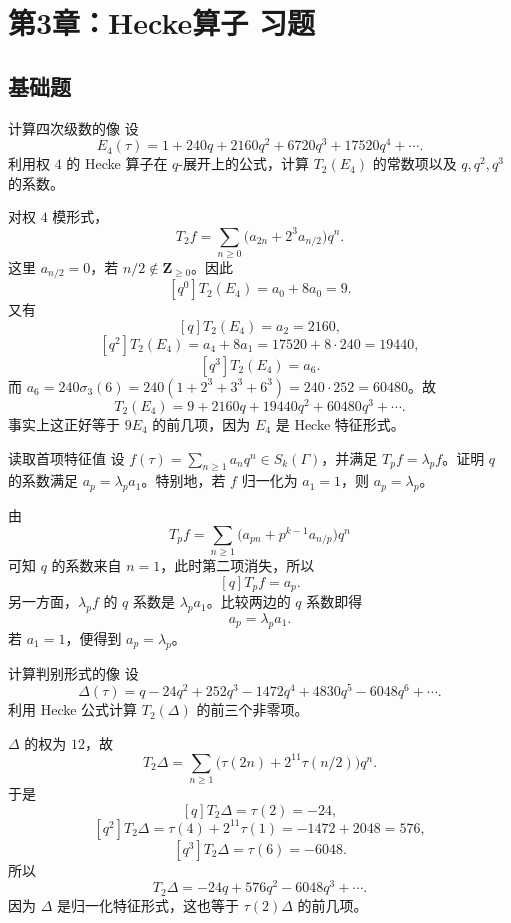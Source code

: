 \chapter{第3章：Hecke算子 习题}

\difficultykey

\section{基础题 \easy}

\begin{problem}{计算四次级数的像}
\easy
设
\[
E_4(\tau)=1+240q+2160q^2+6720q^3+17520q^4+\cdots.
\]
利用权 $4$ 的 Hecke 算子在 $q$-展开上的公式，计算 $T_2(E_4)$ 的常数项以及 $q,q^2,q^3$ 的系数。
\end{problem}
\begin{solution}
对权 $4$ 模形式，
\[
T_2f=\sum_{n\ge0}\bigl(a_{2n}+2^3a_{n/2}\bigr)q^n.
\]
这里 $a_{n/2}=0$，若 $n/2\notin \mathbf Z_{\ge0}$。因此
\[
[q^0]T_2(E_4)=a_0+8a_0=9.
\]
又有
\[
[q]T_2(E_4)=a_2=2160,
\]
\[
[q^2]T_2(E_4)=a_4+8a_1=17520+8\cdot240=19440,
\]
\[
[q^3]T_2(E_4)=a_6.
\]
而 $a_6=240\sigma_3(6)=240(1+2^3+3^3+6^3)=240\cdot252=60480$。故
\[
T_2(E_4)=9+2160q+19440q^2+60480q^3+\cdots.
\]
事实上这正好等于 $9E_4$ 的前几项，因为 $E_4$ 是 Hecke 特征形式。
\end{solution}

\begin{problem}{读取首项特征值}
\easy
设 $f(\tau)=\sum_{n\ge1}a_nq^n\in S_k(\Gamma)$，并满足 $T_pf=\lambda_pf$。证明 $q$ 的系数满足 $a_p=\lambda_pa_1$。特别地，若 $f$ 归一化为 $a_1=1$，则 $a_p=\lambda_p$。
\end{problem}
\begin{solution}
由
\[
T_pf=\sum_{n\ge1}\bigl(a_{pn}+p^{k-1}a_{n/p}\bigr)q^n
\]
可知 $q$ 的系数来自 $n=1$，此时第二项消失，所以
\[
[q]T_pf=a_p.
\]
另一方面，$\lambda_pf$ 的 $q$ 系数是 $\lambda_pa_1$。比较两边的 $q$ 系数即得
\[
a_p=\lambda_pa_1.
\]
若 $a_1=1$，便得到 $a_p=\lambda_p$。
\end{solution}

\begin{problem}{计算判别形式的像}
\easy
设
\[
\Delta(\tau)=q-24q^2+252q^3-1472q^4+4830q^5-6048q^6+\cdots.
\]
利用 Hecke 公式计算 $T_2(\Delta)$ 的前三个非零项。
\end{problem}
\begin{solution}
$\Delta$ 的权为 $12$，故
\[
T_2\Delta=\sum_{n\ge1}\bigl(\tau(2n)+2^{11}\tau(n/2)\bigr)q^n.
\]
于是
\[
[q]T_2\Delta=\tau(2)=-24,
\]
\[
[q^2]T_2\Delta=\tau(4)+2^{11}\tau(1)=-1472+2048=576,
\]
\[
[q^3]T_2\Delta=\tau(6)=-6048.
\]
所以
\[
T_2\Delta=-24q+576q^2-6048q^3+\cdots.
\]
因为 $\Delta$ 是归一化特征形式，这也等于 $\tau(2)\Delta$ 的前几项。
\end{solution}

